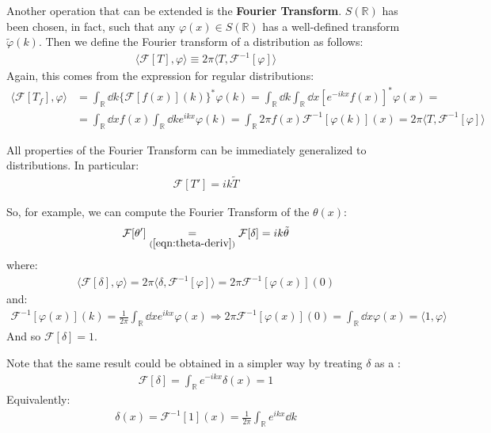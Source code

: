 \documentclass[../template.tex]{subfiles}
\begin{document}
\medskip

Another operation that can be extended is the \textbf{Fourier Transform}.  $S(\mathbb{R})$ has been chosen, in fact, such that any $\varphi(x) \in S(\mathbb{R})$ has a well-defined transform $\tilde{\varphi}(k)$. Then we define the Fourier transform of a distribution as follows:
\begin{align*}
    \langle \mathcal{F}[T], \varphi \rangle \equiv 2\pi\langle T, \mathcal{F}^{-1}[\varphi] \rangle
\end{align*}
Again, this comes from the expression for regular distributions:
\begin{align*}
    \langle \mathcal{F}[T_f], \varphi \rangle &= \int_{\mathbb{R}} \dd{k} \{\mathcal{F}[f(x)](k)\}^* \varphi(k) = \int_{\mathbb{R}} \dd{k} \int_{\mathbb{R}} \dd{x} \left[e^{-ikx} f(x)\right]^* \varphi(x) =\\
    &= \int_{\mathbb{R}} \dd{x} f(x) \int_{\mathbb{R}} \dd{k} e^{ikx}  \varphi(k) = \int_{\mathbb{R}} 2\pi f(x) \mathcal{F}^{-1}[\varphi(k)](x) = 2 \pi\langle T, \mathcal{F}^{-1}[\varphi]  \rangle
\end{align*}

All properties of the Fourier Transform can be immediately generalized to distributions. In particular:
\begin{align*}
    \mathcal{F}[T'] = ik \tilde{T}
\end{align*}

So, for example, we can compute the Fourier Transform of the $\theta(x)$: 
\begin{align} \label{eqn:theta-transf1}
    \mathcal{F}[\theta'] \underset{(\ref{eqn:theta-deriv})}{=}  \mathcal{F}[\delta] = ik \tilde{\theta}
\end{align}
where: 
\begin{align*}
    \langle \mathcal{F}[\delta], \varphi \rangle = 2 \pi\langle \delta, \mathcal{F}^{-1}[\varphi]\rangle = 2\pi\mathcal{F}^{-1}[\varphi(x)](0)
\end{align*}
and:
\begin{align*}
    \mathcal{F}^{-1}[\varphi(x)](k) = \frac{1}{2\pi} \int_{\mathbb{R}} \dd{x} e^{ikx} \varphi(x) \Rightarrow 2 \pi\mathcal{F}^{-1}[\varphi(x)](0) = \int_{\mathbb{R}} \dd{x} \varphi(x) = \langle 1, \varphi \rangle 
\end{align*}
And so $\mathcal{F}[\delta] = 1$. 

Note that the same result could be obtained in a simpler way by treating $\delta$ as a :
\begin{align*}
    \mathcal{F}[\delta] = \int_{\mathbb{R}} e^{-ikx} \delta(x) = 1
\end{align*}
Equivalently:
\begin{align*}
    \delta(x) = \mathcal{F}^{-1}[1](x) = \frac{1}{2\pi} \int_{\mathbb{R}} e^{ikx} \dd{k}
\end{align*}
\end{document}
